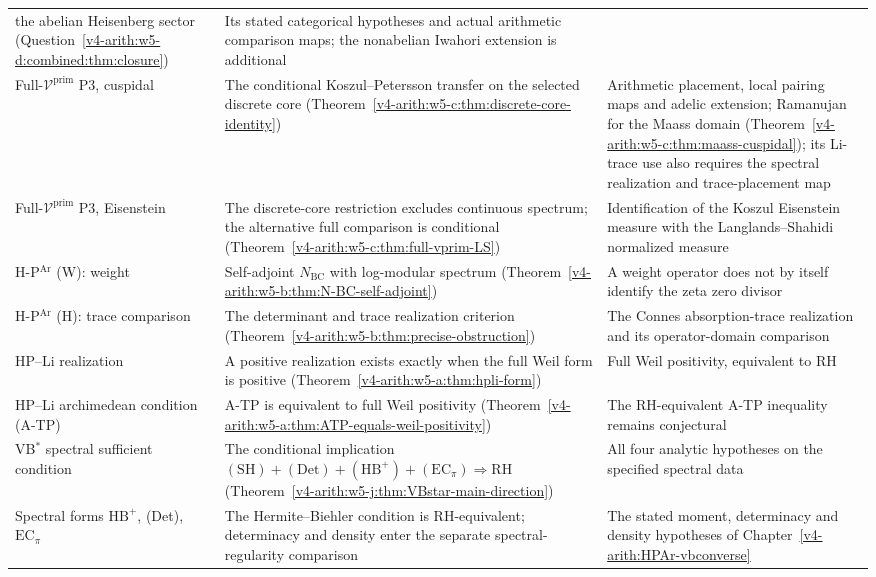 \begin{longtable}{@{}p{}|p{}|p{}@{}}
the abelian Heisenberg sector
(Question~\ref{v4-arith:w5-d:combined:thm:closure}) & Its stated categorical
hypotheses and actual arithmetic comparison maps; the nonabelian
Iwahori extension is additional \\
Full-\(\mathcal V^{\mathrm{prim}}\) P3, cuspidal & The
conditional Koszul--Petersson transfer on the selected discrete core
(Theorem~\ref{v4-arith:w5-c:thm:discrete-core-identity}) & Arithmetic placement, local pairing maps and adelic extension;
Ramanujan for the Maass domain
(Theorem~\ref{v4-arith:w5-c:thm:maass-cuspidal}); its Li-trace use also
requires the spectral realization and trace-placement map \\
Full-\(\mathcal V^{\mathrm{prim}}\) P3, Eisenstein & The discrete-core
restriction excludes continuous spectrum; the alternative full
comparison is conditional
(Theorem~\ref{v4-arith:w5-c:thm:full-vprim-LS}) & Identification of the Koszul
Eisenstein measure with the Langlands--Shahidi normalized measure \\
H-P\(^{\mathrm{Ar}}\) (W): weight & Self-adjoint
\(N_{\mathrm{BC}}\) with log-modular spectrum
(Theorem~\ref{v4-arith:w5-b:thm:N-BC-self-adjoint}) & A weight operator does
not by itself identify the zeta zero divisor \\
H-P\(^{\mathrm{Ar}}\) (H): trace comparison & The determinant and
trace realization criterion
(Theorem~\ref{v4-arith:w5-b:thm:precise-obstruction}) & The Connes
absorption-trace realization and its operator-domain comparison \\
HP--Li realization & A positive realization exists exactly when the
full Weil form is positive
(Theorem~\ref{v4-arith:w5-a:thm:hpli-form}) & Full Weil positivity, equivalent
to RH \\
HP--Li archimedean condition (A-TP) & A-TP is equivalent to full Weil
positivity (Theorem~\ref{v4-arith:w5-a:thm:ATP-equals-weil-positivity}) & The
RH-equivalent A-TP inequality remains conjectural \\
VB\(^{*}\) spectral sufficient condition & The conditional implication
\((\mathrm{SH})+(\mathrm{Det})+(\mathrm{HB}^{+})+(\mathrm{EC}_\pi)
\Rightarrow\mathrm{RH}\)
(Theorem~\ref{v4-arith:w5-j:thm:VBstar-main-direction}) & All four analytic
hypotheses on the specified spectral data \\
Spectral forms \(\mathrm{HB}^{+}\), (Det), \(\mathrm{EC}_\pi\) & The
Hermite--Biehler condition is RH-equivalent; determinacy and density
enter the separate spectral-regularity comparison & The stated
moment, determinacy and density hypotheses of Chapter~\ref{v4-arith:HPAr-vbconverse} \\

\end{longtable}
